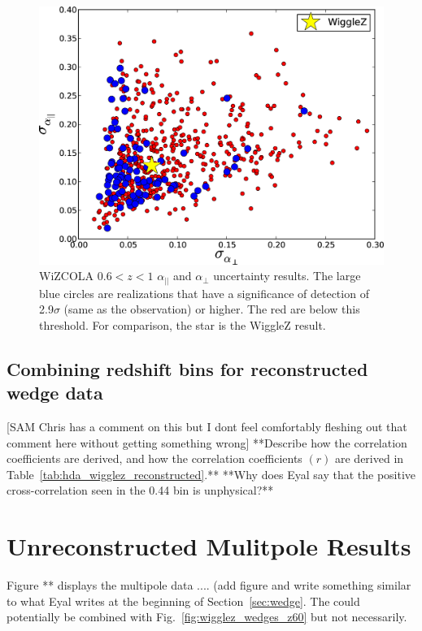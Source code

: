 \documentclass[iop,twocolappendix]{emulateapj}
\newcommand{\blue}{\color{blue}}
\newcommand{\red}{\color{red}}
\begin{document}
\begin{figure}
\begin{center}
\includegraphics[width=0.7\columnwidth]{figures/WiZCOLA_unc_z0pt6_1pt0/WiZCOLA_unc_z0pt6_1pt0}
\caption{\label{fig:wizcola_hdaUnc_z60_epsilonT15} WiZCOLA $0.6<z<1$ $\alpha_{||}$ and $\alpha_\perp$ uncertainty results. The large blue circles are realizations that have a significance of detection of 2.9$\sigma$ (same as the observation) or higher. The red are below this threshold. For comparison, the star is the WiggleZ result.%
}
\end{center}
\end{figure}

\subsection{Combining redshift bins for reconstructed wedge data}
 {\blue
{\red [SAM Chris has a comment on this but I dont feel comfortably fleshing out that comment here without getting something wrong]}
**Describe how the correlation coefficients are derived, and how the correlation coefficients $(r)$ are derived in Table~\ref{tab:hda_wigglez_reconstructed}.**  **Why does Eyal say that the positive cross-correlation seen in the 0.44 bin is unphysical?**

} %








\section{Unreconstructed Mulitpole Results}
\label{sec:multi}
{\blue Figure ** displays the multipole data .... (add figure and write something similar to what Eyal writes at the beginning of Section~\ref{sec:wedge}.  The could potentially be combined with Fig.~\ref{fig:wigglez_wedges_z60} but not necessarily. }
\end{document}
